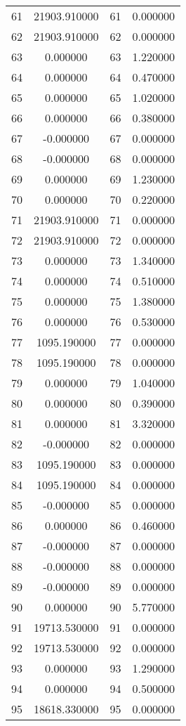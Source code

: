 \documentclass[12pt]{article}
\begin{document}
\begin{longtable}{@{}cccc@{}}
61 & 21903.910000 & 61 & 0.000000 \\
62 & 21903.910000 & 62 & 0.000000 \\
63 & 0.000000 & 63 & 1.220000 \\
64 & 0.000000 & 64 & 0.470000 \\
65 & 0.000000 & 65 & 1.020000 \\
66 & 0.000000 & 66 & 0.380000 \\
67 & -0.000000 & 67 & 0.000000 \\
68 & -0.000000 & 68 & 0.000000 \\
69 & 0.000000 & 69 & 1.230000 \\
70 & 0.000000 & 70 & 0.220000 \\
71 & 21903.910000 & 71 & 0.000000 \\
72 & 21903.910000 & 72 & 0.000000 \\
73 & 0.000000 & 73 & 1.340000 \\
74 & 0.000000 & 74 & 0.510000 \\
75 & 0.000000 & 75 & 1.380000 \\
76 & 0.000000 & 76 & 0.530000 \\
77 & 1095.190000 & 77 & 0.000000 \\
78 & 1095.190000 & 78 & 0.000000 \\
79 & 0.000000 & 79 & 1.040000 \\
80 & 0.000000 & 80 & 0.390000 \\
81 & 0.000000 & 81 & 3.320000 \\
82 & -0.000000 & 82 & 0.000000 \\
83 & 1095.190000 & 83 & 0.000000 \\
84 & 1095.190000 & 84 & 0.000000 \\
85 & -0.000000 & 85 & 0.000000 \\
86 & 0.000000 & 86 & 0.460000 \\
87 & -0.000000 & 87 & 0.000000 \\
88 & -0.000000 & 88 & 0.000000 \\
89 & -0.000000 & 89 & 0.000000 \\
90 & 0.000000 & 90 & 5.770000 \\
91 & 19713.530000 & 91 & 0.000000 \\
92 & 19713.530000 & 92 & 0.000000 \\
93 & 0.000000 & 93 & 1.290000 \\
94 & 0.000000 & 94 & 0.500000 \\
95 & 18618.330000 & 95 & 0.000000 \\

\end{longtable}
\end{document}
